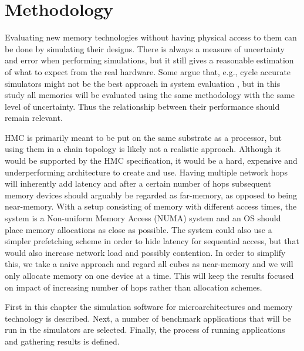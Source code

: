\chapter{Methodology} \label{method}
Evaluating new memory technologies without having physical access to them can be done by simulating their designs. There is always a measure of uncertainty and error when performing simulations, but it still gives a reasonable estimation of what to expect from the real hardware. Some argue that, e.g., cycle accurate simulators might not be the best approach in system evaluation \cite{weaver2008cycle}, but in this study all memories will be evaluated  using the same methodology with the same level of uncertainty. Thus the relationship between their performance should remain relevant. 
\bigskip

HMC is primarily meant to be put on the same substrate as a processor, but using them in a chain topology is likely not a realistic approach. Although it would be supported by the HMC specification, it would be a hard, expensive and underperforming architecture to create and use. Having multiple network hops will inherently add latency and after a certain number of hops subsequent memory devices should arguably be regarded as far-memory, as opposed to being near-memory. With a setup consisting of memory with different access times, the system is a Non-uniform Memory Access (NUMA) system and an OS should place memory allocations as close as possible. The system could also use a simpler prefetching scheme in order to hide latency for sequential access, but that would also increase network load and possibly contention. In order to simplify this, we take a naive approach and regard all cubes as near-memory and we will only allocate memory on one device at a time. This will keep the results focused on impact of increasing number of hops rather than allocation schemes.
\bigskip

First in this chapter the simulation software for microarchitectures and memory technology is described. Next, a number of benchmark applications that will be run in the simulators are selected. Finally, the process of running applications and gathering results is defined.


